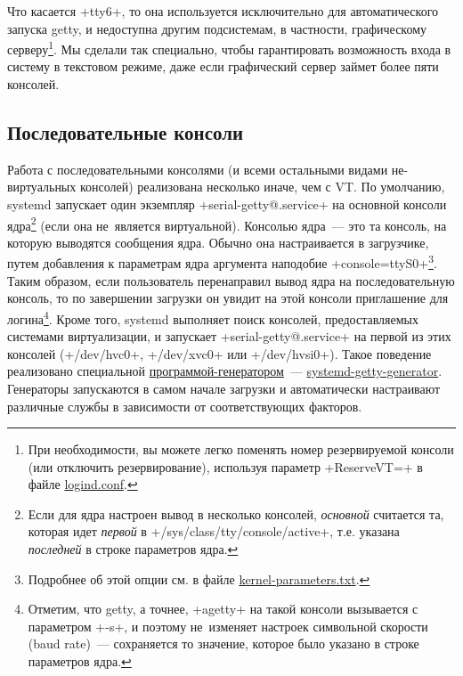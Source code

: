 \documentclass[10pt,oneside,a4paper]{article}
\begin{document}
Что касается +tty6+, то она используется исключительно для автоматического
запуска getty, и недоступна другим подсистемам, в частности, графическому
серверу\footnote{При необходимости, вы можете легко поменять номер резервируемой
консоли (или отключить резервирование), используя параметр +ReserveVT=+ в файле
\href{http://www.freedesktop.org/software/systemd/man/logind.conf.html}{logind.conf}.}.
Мы сделали так специально, чтобы гарантировать возможность входа в систему в
текстовом режиме, даже если графический сервер займет более пяти консолей.

\subsection{Последовательные консоли}

Работа с последовательными консолями (и всеми остальными видами не-виртуальных
консолей) реализована несколько иначе, чем с VT. По умолчанию, systemd запускает
один экземпляр +serial-getty@.service+ на основной консоли ядра\footnote{Если
для ядра настроен вывод в несколько консолей, \emph{основной} считается та, которая
идет \emph{первой} в +/sys/class/tty/console/active+, т.е. указана
\emph{последней} в строке параметров ядра.} (если она не~является виртуальной).
Консолью ядра~--- это та консоль, на которую выводятся сообщения ядра. Обычно
она настраивается в загрузчике, путем добавления к параметрам ядра аргумента
наподобие +console=ttyS0+\footnote{Подробнее об этой опции см. в файле
\href{https://www.kernel.org/doc/Documentation/kernel-parameters.txt}{kernel-parameters.txt}.}.
Таким образом, если пользователь перенаправил вывод ядра на последовательную
консоль, то по завершении загрузки он увидит на этой консоли приглашение для
логина\footnote{Отметим, что getty, а точнее, +agetty+ на такой консоли
вызывается с параметром +-s+, и поэтому не~изменяет настроек символьной
скорости (baud rate)~--- сохраняется то значение, которое было указано в строке
параметров ядра.}. Кроме того, systemd выполняет поиск консолей, предоставляемых
системами виртуализации, и запускает +serial-getty@.service+ на первой из этих
консолей (+/dev/hvc0+, +/dev/xvc0+ или +/dev/hvsi0+). Такое поведение
реализовано специальной
\href{http://www.freedesktop.org/wiki/Software/systemd/Generators}{программой-генератором}~---
\href{http://www.freedesktop.org/software/systemd/man/systemd-getty-generator.html}{systemd-getty-generator}.
Генераторы запускаются в самом начале загрузки и автоматически настраивают
различные службы в зависимости от соответствующих факторов.
\end{document}
